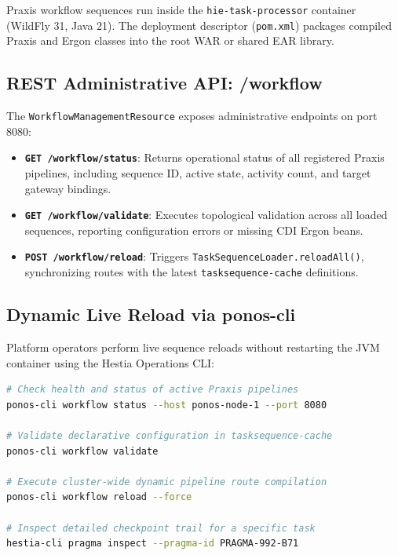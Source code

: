 Praxis workflow sequences run inside the \texttt{hie-task-processor} container (WildFly 31, Java 21). The deployment descriptor (\texttt{pom.xml}) packages compiled Praxis and Ergon classes into the root WAR or shared EAR library.

\subsection{REST Administrative API: /workflow}
\label{subsec:ops_rest_api}

The \texttt{WorkflowManagementResource} exposes administrative endpoints on port 8080:
\begin{itemize}
    \item \textbf{\texttt{GET /workflow/status}}: Returns operational status of all registered Praxis pipelines, including sequence ID, active state, activity count, and target gateway bindings.
    \item \textbf{\texttt{GET /workflow/validate}}: Executes topological validation across all loaded sequences, reporting configuration errors or missing CDI Ergon beans.
    \item \textbf{\texttt{POST /workflow/reload}}: Triggers \texttt{TaskSequenceLoader.reloadAll()}, synchronizing routes with the latest \texttt{tasksequence-cache} definitions.
\end{itemize}

\subsection{Dynamic Live Reload via ponos-cli}
\label{subsec:ops_cli_reload}

Platform operators perform live sequence reloads without restarting the JVM container using the Hestia Operations CLI:

\begin{lstlisting}[language=bash, caption={Operating Dynamic Sequence Reloads with ponos-cli}]
# Check health and status of active Praxis pipelines
ponos-cli workflow status --host ponos-node-1 --port 8080

# Validate declarative configuration in tasksequence-cache
ponos-cli workflow validate

# Execute cluster-wide dynamic pipeline route compilation
ponos-cli workflow reload --force

# Inspect detailed checkpoint trail for a specific task
hestia-cli pragma inspect --pragma-id PRAGMA-992-B71
\end{lstlisting}

